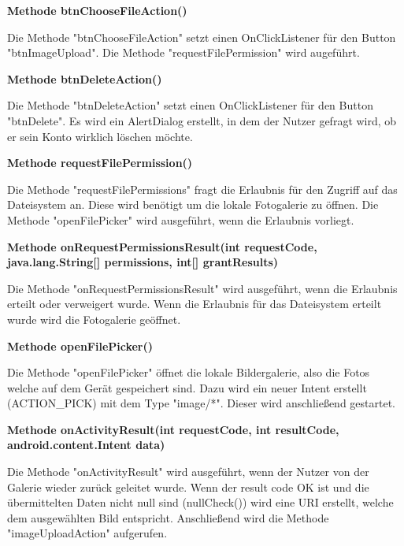 \documentclass{scrartcl}
\begin{document}
\noindent\textbf{Methode btnChooseFileAction()}

\noindent Die Methode "btnChooseFileAction" setzt einen OnClickListener für den Button "btnImageUpload". Die Methode "requestFilePermission" wird augeführt. \newline 

\noindent\textbf{Methode btnDeleteAction()}

\noindent Die Methode "btnDeleteAction" setzt einen OnClickListener für den Button "btnDelete". Es wird ein AlertDialog erstellt, in dem der Nutzer gefragt wird, ob er sein Konto wirklich löschen möchte. \newline 

\noindent\textbf{Methode requestFilePermission()}

\noindent Die Methode "requestFilePermissions" fragt die Erlaubnis für den Zugriff auf das Dateisystem an. Diese wird benötigt um die lokale Fotogalerie zu öffnen. Die Methode "openFilePicker" wird ausgeführt, wenn die Erlaubnis vorliegt. \newline 

\noindent\textbf{Methode onRequestPermissionsResult(int requestCode, \newline              java.lang.String[] permissions, int[] grantResults)}

\noindent Die Methode "onRequestPermissionsResult" wird ausgeführt, wenn die Erlaubnis erteilt oder verweigert wurde. Wenn die Erlaubnis für das Dateisystem erteilt wurde wird die Fotogalerie geöffnet. \newline

\noindent\textbf{Methode openFilePicker()}

\noindent Die Methode "openFilePicker" öffnet die lokale Bildergalerie, also die Fotos welche auf dem Gerät gespeichert sind. Dazu wird ein neuer Intent erstellt (ACTION\_PICK) mit dem Type "image/*". Dieser wird anschließend gestartet. \newline 

\noindent\textbf{Methode onActivityResult(int requestCode, \newline int resultCode, android.content.Intent data)}

\noindent Die Methode "onActivityResult" wird ausgeführt, wenn der Nutzer von der Galerie wieder zurück geleitet wurde. Wenn der result code OK ist und die übermittelten Daten nicht null sind (nullCheck()) wird eine URI erstellt, welche dem ausgewählten Bild entspricht. Anschließend wird die Methode "imageUploadAction" aufgerufen. \newline
\end{document}
